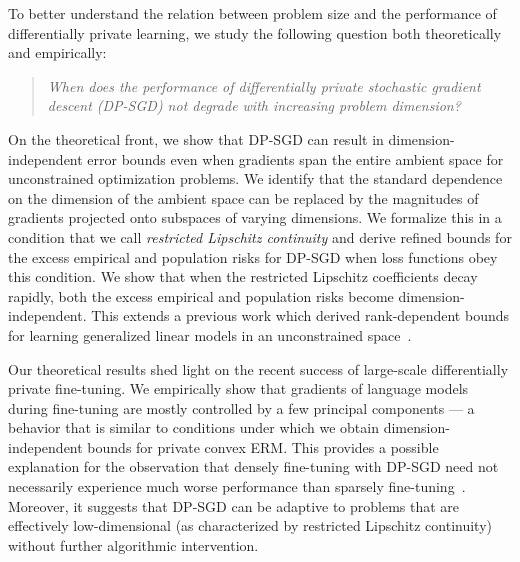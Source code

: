 To better understand the relation between problem size and the performance of differentially private learning, we study the following question both theoretically and empirically:
\begin{quote}
	\centering
	\emph{When does the performance of differentially private stochastic gradient descent (DP-SGD) not degrade with increasing problem dimension?}
\end{quote}

On the theoretical front, we show that DP-SGD can result in dimension-independent error bounds even when gradients span the entire ambient space for unconstrained optimization problems.
We identify that the standard dependence on the dimension of the ambient space can be replaced by the magnitudes of gradients projected onto subspaces of varying dimensions.
We formalize this in a condition that we call \textit{restricted Lipschitz continuity} and derive refined bounds for the excess empirical and population risks for DP-SGD when loss functions obey this condition. 
We show that when the restricted Lipschitz coefficients decay rapidly, both the excess empirical and population risks become dimension-independent.
This extends a previous work which derived rank-dependent bounds for learning generalized linear models in an unconstrained space~\citep{song2021evading}. 

Our theoretical results shed light on the recent success of large-scale differentially private fine-tuning.
We empirically show that gradients of language models during fine-tuning are mostly controlled by a few principal components --- a behavior that is similar to conditions under which we obtain dimension-independent bounds for private convex ERM. 
This provides a possible explanation for the observation that densely fine-tuning with DP-SGD need not necessarily experience much worse performance than sparsely fine-tuning~\citep{li2021large}. Moreover, it suggests that DP-SGD can be adaptive to problems that are effectively low-dimensional (as characterized by restricted Lipschitz continuity) without further algorithmic intervention.

